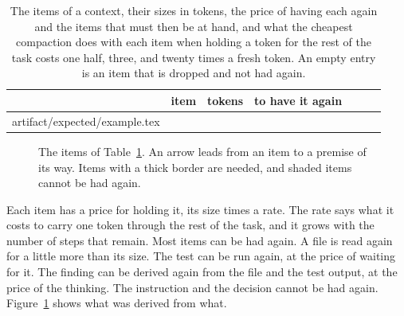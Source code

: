 \documentclass[acmsmall,nonacm,screen]{acmart}
\makeatletter
\newcommand{\rows}[1]{\@@input artifact/expected/#1.tex }
\makeatother
\begin{document}
\begin{table}
\caption{The items of a context, their sizes in tokens, the price of having each again and
the items that must then be at hand, and what the cheapest compaction does with each item
when holding a token for the rest of the task costs one half, three, and twenty times a fresh
token. An empty entry is an item that is dropped and not had again.}\label{tab:example}
\begin{tabular}{rlrllll}
\toprule
 & item & tokens & to have it again & \exRateLow{} & \exRateMiddle{} & \exRateHigh{} \\
\midrule
\rows{example}
\bottomrule
\end{tabular}
\end{table}

\begin{figure}
\centering
{}
\caption{The items of Table~\ref{tab:example}. An arrow leads from an item to a premise of
its way. Items with a thick border are needed, and shaded items cannot be had
again.}\label{fig:example}
\end{figure}

Each item has a price for holding it, its size times a rate. The rate says what it costs to
carry one token through the rest of the task, and it grows with the number of steps that
remain. Most items can be had again. A file is read again for a little more than its size.
The test can be run again, at the price of waiting for it. The finding can be derived again
from the file and the test output, at the price of the thinking. The instruction and the
decision cannot be had again. Figure~\ref{fig:example} shows what was derived from what.
\end{document}
